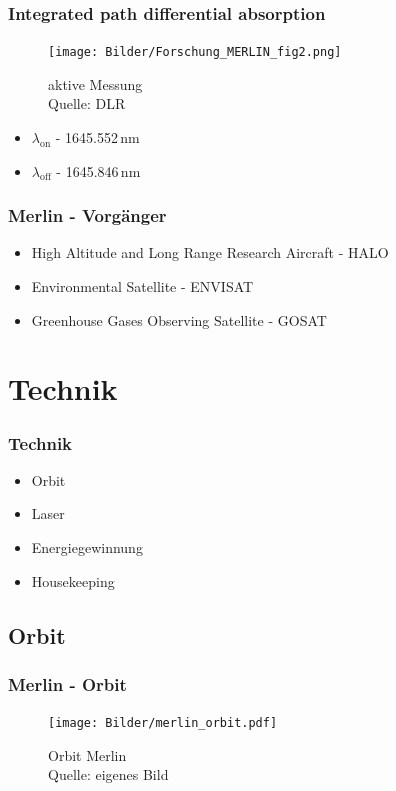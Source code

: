 \documentclass{beamer}
\begin{document}
\begin{frame}
  \frametitle{Integrated path differential absorption}
  \begin{figure}[t]
    \centering
    \texttt{[image: Bilder/Forschung\_MERLIN\_fig2.png]}
    \caption{aktive Messung\\ 
    Quelle: DLR}\label{fig:IPDA}
  \end{figure}

  \begin{itemize}
    \item $\lambda_{\mathrm{on}}$ - 1645.552\,nm
    \item $\lambda_{\mathrm{off}}$ - 1645.846\,nm
  \end{itemize}  
\end{frame}

\begin{frame}
  \frametitle{Merlin - Vorgänger}
  \begin{itemize}
    \item High Altitude and Long Range Research Aircraft - HALO
    \item Environmental Satellite - ENVISAT
    \item Greenhouse Gases Observing Satellite - GOSAT
  \end{itemize}
\end{frame}

\section{Technik}
\begin{frame}
  \frametitle{Technik}
  \begin{itemize}
    \item Orbit
    \item Laser
    \item Energiegewinnung 
    \item Housekeeping
  \end{itemize}
\end{frame}

\subsection{Orbit}
\begin{frame}
  \frametitle{Merlin - Orbit}
  \begin{figure}[t]
    \centering
    \texttt{[image: Bilder/merlin\_orbit.pdf]}
    \caption{Orbit Merlin\\ 
    Quelle: eigenes Bild}\label{fig:MERLORBIT}
  \end{figure}
\end{frame}
\end{document}
